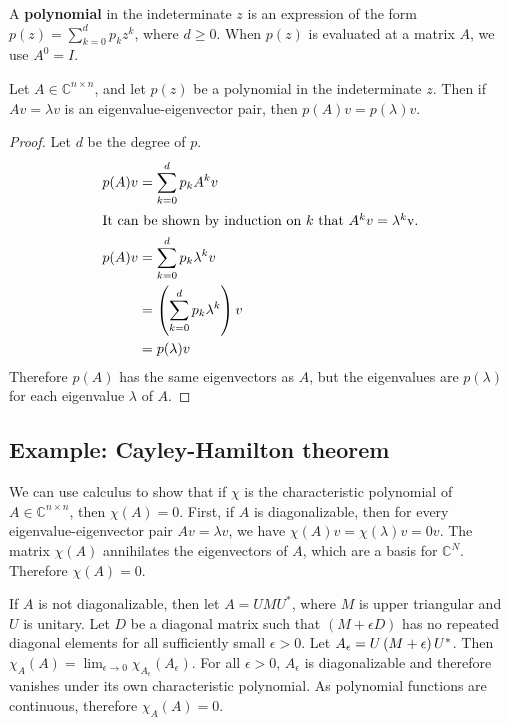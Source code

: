 A \textbf{polynomial} in the indeterminate \(z\) is an expression of the form
\(p(z) = \sum_{k = 0}^{d} p_k z^k\), where \(d \geq 0\).
When \(p(z)\) is evaluated at a matrix \(A\), we use \(A^0 = I\).
\begin{lemma}
  Let \(A \in\mathbb{C}^{n\times n}\), and let \(p(z)\) be a polynomial in the indeterminate \(z\).
  Then if \(Av = \lambda v\) is an eigenvalue-eigenvector pair,
  then \(p(A) v = p(\lambda) v\).
\end{lemma}
\begin{proof}
  Let \(d\) be the degree of \(p\).
  \begin{align}
    p(A) v &= \sum_{k=0}^{d} p_k A^k v\\
    \intertext{It can be shown by induction on \(k\) that \(A^k v = \lambda^k\)v.}
    p(A) v &= \sum_{k=0}^{d} p_k \lambda^k v \\
    &= \del{\sum_{k=0}^{d} p_k \lambda^k} v\\
    &= p(\lambda) v
  \end{align}
  Therefore \(p(A)\) has the same eigenvectors as \(A\), but the eigenvalues are \(p(\lambda)\) for each eigenvalue \(\lambda\) of \(A\).
\end{proof}

\subsection{Example: Cayley-Hamilton theorem}
We can use calculus to show that if \(\chi\) is the characteristic polynomial of \(A\in\mathbb{C}^{n\times n}\), then \(\chi(A) = 0\).
First, if \(A\) is diagonalizable, then for every eigenvalue-eigenvector pair
\(A v = \lambda v\), we have \(\chi(A) v = \chi(\lambda) v = 0v\).
The matrix \(\chi(A)\) annihilates the eigenvectors of \(A\), which are a basis for \(\mathbb{C}^N\). Therefore \(\chi(A) = 0\).

If \(A\) is not diagonalizable, then let \(A = U M U^*\), where \(M\) is upper triangular and \(U\) is unitary.
Let \(D\) be a diagonal matrix such that \((M+\epsilon D)\) has no repeated diagonal elements for all sufficiently small \(\epsilon > 0\).
Let \(A_\epsilon = U\del{M + \epsilon}U^*\).
Then \(\chi_A(A) = \lim_{\epsilon \to 0} \chi_{A_\epsilon}(A_\epsilon)\).
For all \(\epsilon > 0\), \(A_\epsilon\) is diagonalizable and therefore vanishes under its own characteristic polynomial.
As polynomial functions are continuous, therefore \(\chi_A(A) =0 \).


